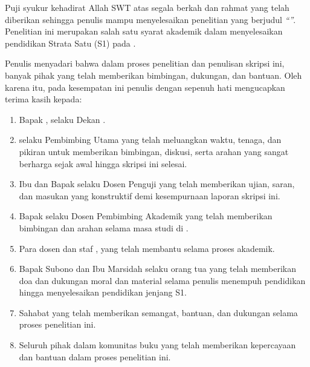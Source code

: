 

Puji syukur kehadirat Allah SWT atas segala berkah dan rahmat yang telah diberikan sehingga penulis mampu menyelesaikan
penelitian yang berjudul \textit{``\titleUpperCase''}. Penelitian ini merupakan salah satu syarat akademik dalam menyelesaikan pendidikan Strata Satu (S1) pada \studyProgram{} \faculty{} \university{}.

Penulis menyadari bahwa dalam proses penelitian dan penulisan skripsi ini, banyak pihak yang telah memberikan bimbingan, dukungan, dan bantuan. Oleh karena itu, pada kesempatan ini penulis dengan sepenuh hati mengucapkan terima kasih kepada:

\begin{enumerate}[nosep]
    \item Bapak \dean{}, selaku Dekan \faculty{} \university{}.
    \item \supervisor{} selaku Pembimbing Utama yang telah meluangkan waktu, tenaga, dan pikiran untuk memberikan bimbingan, diskusi, serta arahan yang sangat berharga sejak awal hingga skripsi ini selesai.
    \item Ibu \examinerOne{} dan Bapak \examinerTwo{} selaku Dosen Penguji yang telah memberikan ujian, saran, dan masukan yang konstruktif demi kesempurnaan laporan skripsi ini.
    \item Bapak \academicAdvisor{} selaku Dosen Pembimbing Akademik yang telah memberikan bimbingan dan arahan selama masa studi di \studyProgram{}.
    \item Para dosen dan staf \faculty{}, \university{} yang telah membantu selama proses akademik.
    \item Bapak Subono dan Ibu Marsidah selaku orang tua yang telah memberikan doa dan dukungan moral dan material selama penulis menempuh pendidikan hingga menyelesaikan pendidikan jenjang S1.
    \item Sahabat yang telah memberikan semangat, bantuan, dan dukungan selama proses penelitian ini.
    \item Seluruh pihak dalam komunitas buku yang telah memberikan kepercayaan dan bantuan dalam proses penelitian ini.
\end{enumerate}


